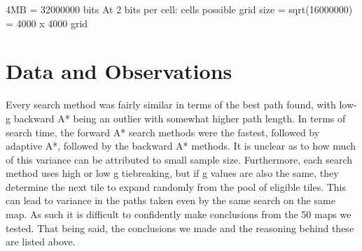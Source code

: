 \documentclass[a4paper,12pt]{article}
\begin{document}
4MB = 32000000 bits \newline
At 2 bits per cell:  cells possible \newline 
	grid size = sqrt(16000000) = 4000 x 4000 grid
\section{Data and Observations}
Every search method was fairly similar in terms of the best path found, with low-g backward A* being an outlier with somewhat higher path length. In terms of search time, the forward A* search methods were the fastest, followed by adaptive A*, followed by the backward A* methods. It is unclear as to how much of this variance can be attributed to small sample size. Furthermore, each search method uses high or low g tiebreaking, but if g values are also the same, they determine the next tile to expand randomly from the pool of eligible tiles. This can lead to variance in the paths taken even by the same search on the same map. As such it is difficult to confidently make conclusions from the 50 maps we tested. That being said, the conclusions we made and the reasoning behind these are listed above.
\end{document}
